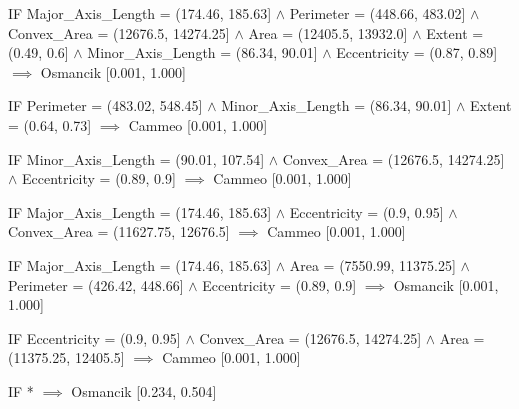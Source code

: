 IF Major_Axis_Length = (174.46, 185.63] $\land$ Perimeter = (448.66, 483.02] $\land$ Convex_Area = (12676.5, 14274.25] $\land$ Area = (12405.5, 13932.0] $\land$ Extent = (0.49, 0.6] $\land$ Minor_Axis_Length = (86.34, 90.01] $\land$ Eccentricity = (0.87, 0.89] $\implies$ Osmancik [0.001, 1.000]

IF Perimeter = (483.02, 548.45] $\land$ Minor_Axis_Length = (86.34, 90.01] $\land$ Extent = (0.64, 0.73] $\implies$ Cammeo [0.001, 1.000]

IF Minor_Axis_Length = (90.01, 107.54] $\land$ Convex_Area = (12676.5, 14274.25] $\land$ Eccentricity = (0.89, 0.9] $\implies$ Cammeo [0.001, 1.000]

IF Major_Axis_Length = (174.46, 185.63] $\land$ Eccentricity = (0.9, 0.95] $\land$ Convex_Area = (11627.75, 12676.5] $\implies$ Cammeo [0.001, 1.000]

IF Major_Axis_Length = (174.46, 185.63] $\land$ Area = (7550.99, 11375.25] $\land$ Perimeter = (426.42, 448.66] $\land$ Eccentricity = (0.89, 0.9] $\implies$ Osmancik [0.001, 1.000]

IF Eccentricity = (0.9, 0.95] $\land$ Convex_Area = (12676.5, 14274.25] $\land$ Area = (11375.25, 12405.5] $\implies$ Cammeo [0.001, 1.000]

IF * $\implies$ Osmancik [0.234, 0.504]

